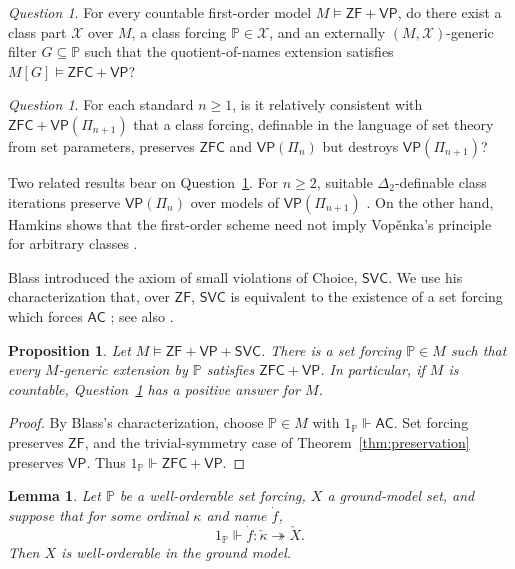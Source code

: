 \documentclass[11pt,a4paper]{amsart}
\newcommand{\VP}{\mathsf{VP}}
\newcommand{\AC}{\mathsf{AC}}
\newcommand{\ZF}{\mathsf{ZF}}
\newcommand{\ZFC}{\mathsf{ZFC}}
\theoremstyle{plain}
\newtheorem{proposition}[theorem]{Proposition}
\newtheorem{lemma}[theorem]{Lemma}
\theoremstyle{definition}
\theoremstyle{remark}
\newtheorem{question}[theorem]{Question}
\begin{document}
\begin{question}\label{q:strong-restoration}
{For every countable first-order model $M\models\ZF+\VP$, do there exist a class part $\mathcal X$ over $M$, a class forcing $\mathbb P\in\mathcal X$, and an externally $(M,\mathcal X)$-generic filter $G\subseteq\mathbb P$ such that the quotient-of-names extension satisfies $M[G]\models\ZFC+\VP$?}
\end{question}

\begin{question}\label{q:selective-destruction}
{For each standard $n\geq1$, is it relatively consistent with $\ZFC+\VP(\Pi_{n+1})$ that a class forcing, definable in the language of set theory from set parameters, preserves $\ZFC$ and $\VP(\Pi_n)$ but destroys $\VP(\Pi_{n+1})$?}
\end{question}

Two related results bear on Question~\ref{q:selective-destruction}.  {For $n\geq2$, suitable $\Delta_2$-definable class iterations preserve $\VP(\Pi_n)$ over models of $\VP(\Pi_{n+1})$ \cite[Theorem~9.6]{BagariaPoveda}.}  {On the other hand, Hamkins shows that the first-order scheme need not imply Vop\v{e}nka's principle for arbitrary classes \cite[Theorem~11]{Hamkins}.}

Blass introduced the axiom of small violations of Choice, $\mathsf{SVC}$.  We use his characterization that, over $\ZF$, $\mathsf{SVC}$ is equivalent to the existence of a set forcing which forces $\AC$ \cite{Blass}; see also \cite[Section~3]{KaragilaDC}.

\begin{proposition}\label{prop:SVC-restoration}
Let $M\models\ZF+\VP+\mathsf{SVC}$.  There is a set forcing $\mathbb P\in M$ such that every $M$-generic extension by $\mathbb P$ satisfies $\ZFC+\VP$.  In particular, if $M$ is countable, Question~\ref{q:strong-restoration} has a positive answer for $M$.
\end{proposition}

\begin{proof}
By Blass's characterization, choose $\mathbb P\in M$ with $1_{\mathbb P}\Vdash\AC$.  Set forcing preserves $\ZF$, and the trivial-symmetry case of Theorem~\ref{thm:preservation} preserves $\VP$.  Thus $1_{\mathbb P}\Vdash\ZFC+\VP$.
\end{proof}

\begin{lemma}\label{lem:wellorderable-forcing}
Let $\mathbb P$ be a well-orderable set forcing, $X$ a ground-model set, and suppose that for some ordinal $\kappa$ and name $\dot f$,
\[
1_{\mathbb P}\Vdash\dot f:\check\kappa\twoheadrightarrow\check X.
\]
Then $X$ is well-orderable in the ground model.
\end{lemma}
\end{document}
